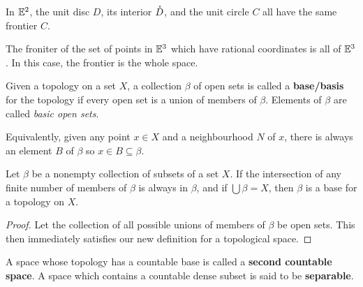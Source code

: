 \begin{example}
    In $\mathbb{E}^2$, the unit disc $D$, its interior $\mathring{D}$, and the unit circle $C$ all have the same frontier $C$.

    The froniter of the set of points in $\mathbb{E}^3$ which have rational coordinates is all of $\mathbb{E}^3$. In this case, the frontier is the whole space.
\end{example}
\begin{definition}
    Given a topology on a set $X$, a collection $\beta$ of open sets is called a \textbf{base/basis} for the topology if every open set is a union of members of $\beta$. Elements of $\beta$ are called \emph{basic open sets}.

    Equivalently, given any point $x \in X$ and a neighbourhood $N$ of $x$, there is always an element $B$ of $\beta$ so $x\in B\subseteq\beta$.
\end{definition}
\begin{theorem}
    Let $\beta$ be a nonempty collection of subsets of a set $X$. If the intersection of any finite number of members of $\beta$ is always in $\beta$, and if $\bigcup\beta=X$, then $\beta$ is a base for a topology on $X$.
\end{theorem}
\begin{proof}
    Let the collection of all possible unions of members of $\beta$ be open sets. This then immediately satisfies our new definition for a topological space.
\end{proof}
\begin{remark}
    A space whose topology has a countable base is called a \textbf{second countable space}. A space which contains a countable dense subset is said to be \textbf{separable}.
\end{remark}